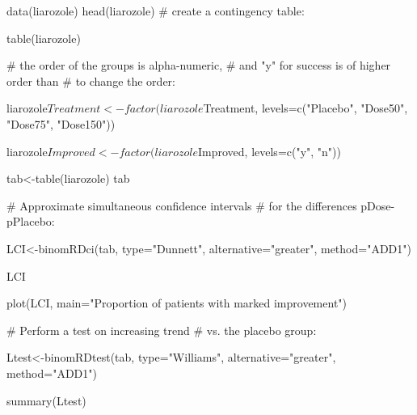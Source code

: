 \begin{Examples}
\begin{ExampleCode}
data(liarozole)
head(liarozole)
# create a contingency table:

table(liarozole)

# the order of the groups is alpha-numeric,
# and "y" for success is of higher order than
# to change the order:

liarozole$Treatment<-factor(liarozole$Treatment,
 levels=c("Placebo", "Dose50", "Dose75", "Dose150"))

liarozole$Improved<-factor(liarozole$Improved,
 levels=c("y", "n"))

tab<-table(liarozole)
tab

# Approximate simultaneous confidence intervals
# for the differences  pDose-pPlacebo:

LCI<-binomRDci(tab, type="Dunnett", 
alternative="greater", method="ADD1")

LCI

plot(LCI, main="Proportion of patients
 with marked improvement")

# Perform a test on increasing trend 
# vs. the placebo group:

Ltest<-binomRDtest(tab, type="Williams", 
alternative="greater", method="ADD1")

summary(Ltest)

\end{ExampleCode}
\end{Examples}

